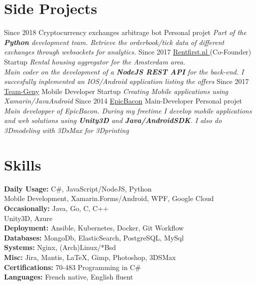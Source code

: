 \documentclass{emonides-cv}
\begin{document}
\vspace{1.5cm}

\section{Side Projects}
\begin{entrylist}
  \entry
    {Since  2018}
    {Cryptocurrency exchanges arbitrage bot {\normalfont }}
    {Personal projet}
    {\emph{Part of the \textbf{Python} development team. Retrieve the orderbook/tick data of different exchanges through websockets for analytics. }}
  \entry
    {Since  2017}
    {\href{https://www.Rentfirst.nl/}{Rentfirst.nl  } {\normalfont  (Co-Founder)}}
    {Startup}
    {\emph{Rental housing aggregator for the Amsterdam area. \\
    Main coder on the development of a \textbf{NodeJS REST API} for the back-end.
    I succesfully inplemented an IOS/Android application listing the offers}}
  \entry
    {Since  2017}
    {\href{http://www.teamgeny.com/}{Team-Geny} {\normalfont Mobile Developer}}
    {Startup}
    {\emph{Creating Mobile applications using Xamarin/JavaAndroid}}
  \entry
    {Since  2014}
    {\href{https://play.google.com/store/apps/developer?id=EpicBacon}{EpicBacon} {\normalfont Main-Developer}}
    {Personal projet}
    {\emph{Main developper of EpicBacon. During my freetime I develop mobile applications and web solutions using \textbf{Unity3D} and \textbf{Java/AndroidSDK}.
    I also do 3Dmodeling with 3DsMax for 3Dprinting  }}
\end{entrylist}
\section{Skills}
\normalsize
\textbf {Daily Usage:}   C\#, JavaScript/NodeJS, Python\\
\normalsize {  Mobile Development, Xamarin.Forms/Android, WPF, Google Cloud}\\
\textbf {Occasionally:} Java, Go, C, C++ \\
Unity3D, Azure\\
\textbf {Deployment:} Ansible, Kubernetes, Docker, Git Workflow\\
\textbf {Databases:} MongoDb, ElasticSearch, PostgreSQL, MySql\\
\textbf {Systems:} Nginx, (Arch)Linux/*Bsd \\
\textbf {Misc:} Jira, Mantis, \LaTeX, Gimp, Photoshop, 3DSMax\\
\textbf { Certifications: } 70-483 Programming in C\#\\
\textbf { Languages: } French native, English fluent
\end{document}
